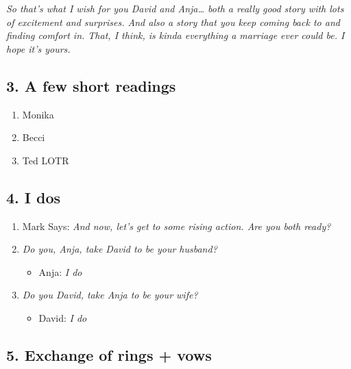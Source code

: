 \emph{So that's what I wish for you David and Anja\ldots{} both a really
good story with lots of excitement and surprises. And also a story that
you keep coming back to and finding comfort in. That, I think, is kinda
everything a marriage ever could be. I hope it's yours.}

\hypertarget{a-few-short-readings}{%
\subsection{3. A few short readings}\label{a-few-short-readings}}

\begin{enumerate}
\def\labelenumi{\arabic{enumi}.}
\tightlist
\item
  Monika
\item
  Becci
\item
  Ted LOTR
\end{enumerate}

\hypertarget{i-dos}{%
\subsection{4. I dos}\label{i-dos}}

\begin{enumerate}
\def\labelenumi{\arabic{enumi}.}
\tightlist
\item
  Mark Says: \emph{And now, let's get to some rising action. Are you
  both ready?}
\item
  \emph{Do you, Anja, take David to be your husband?}

  \begin{itemize}
  \tightlist
  \item
    Anja: \emph{I do}
  \end{itemize}
\item
  \emph{Do you David, take Anja to be your wife?}

  \begin{itemize}
  \tightlist
  \item
    David: \emph{I do}
  \end{itemize}
\end{enumerate}

\hypertarget{exchange-of-rings-vows}{%
\subsection{5. Exchange of rings + vows}\label{exchange-of-rings-vows}}

